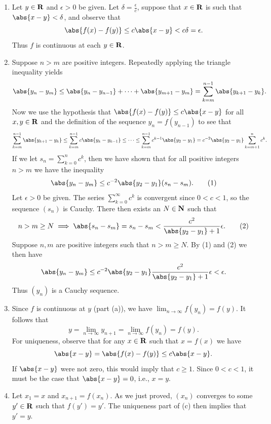 \documentclass{lew98_solutions}
\begin{document}
\begin{solution}
    \begin{enumerate}
        \item Let \( y \in \mathbf{R} \) and \( \epsilon > 0 \) be given. Let \( \delta = \tfrac{\epsilon}{c} \), suppose that \( x \in \mathbf{R} \) is such that \( \abs{x - y} < \delta \), and observe that
        \[
            \abs{f(x) - f(y)} \leq c \abs{x - y} < c \delta = \epsilon.
        \]
        Thus \( f \) is continuous at each \( y \in \mathbf{R} \).

        \item Suppose \( n > m \) are positive integers. Repeatedly applying the triangle inequality yields
        \[
            \abs{y_n - y_m} \leq \abs{y_n - y_{n-1}} + \cdots + \abs{y_{m+1} - y_m} = \sum_{k=m}^{n-1} \abs{y_{k+1} - y_k}.
        \]
        Now we use the hypothesis that \( \abs{f(x) - f(y)} \leq c \abs{x - y} \) for all \( x, y \in \mathbf{R} \) and the definition of the sequence \( y_n = f(y_{n-1}) \) to see that
        \[
            \sum_{k=m}^{n-1} \abs{y_{k+1} - y_k} \leq \sum_{k=m}^{n-1} c \abs{y_k - y_{k-1}} \leq \cdots \leq \sum_{k=m}^{n-1} c^{k-1} \abs{y_2 - y_1} = c^{-2} \abs{y_2 - y_1} \sum_{k=m+1}^n c^k.
        \]
        If we let \( s_n = \sum_{k=0}^n c^k \), then we have shown that for all positive integers \( n > m \) we have the inequality
        \[
            \abs{y_n - y_m} \leq c^{-2} \abs{y_2 - y_1} (s_n - s_m). \tag{1}
        \]
        Let \( \epsilon > 0 \) be given. The series \( \sum_{k=0}^{\infty} c^k \) is convergent since \( 0 < c < 1 \), so the sequence \( (s_n) \) is Cauchy. There then exists an \( N \in \mathbf{N} \) such that
        \[
            n > m \geq N \implies \abs{s_n - s_m} = s_n - s_m < \frac{c^2}{\abs{y_2 - y_1} + 1} \epsilon. \tag{2}
        \]
        Suppose \( n, m \) are positive integers such that \( n > m \geq N \). By (1) and (2) we then have
        \[
            \abs{y_n - y_m} \leq c^{-2} \abs{y_2 - y_1} \frac{c^2}{\abs{y_2 - y_1} + 1} \epsilon < \epsilon.
        \]
        Thus \( (y_n) \) is a Cauchy sequence.

        \item Since \( f \) is continuous at \( y \) (part (a)), we have \( \lim_{n \to \infty} f(y_n) = f(y) \). It follows that
        \[
            y = \lim_{n \to \infty} y_{n+1} = \lim_{n \to \infty} f(y_n) = f(y).
        \]
        For uniqueness, observe that for any \( x \in \mathbf{R} \) such that \( x = f(x) \) we have
        \[
            \abs{x - y} = \abs{f(x) - f(y)} \leq c \abs{x - y}.
        \]
        If \( \abs{x - y} \) were not zero, this would imply that \( c \geq 1 \). Since \( 0 < c < 1 \), it must be the case that \( \abs{x - y} = 0 \), i.e., \( x = y \).

        \item Let \( x_1 = x \) and \( x_{n+1} = f(x_n) \). As we just proved, \( (x_n) \) converges to some \( y' \in \mathbf{R} \) such that \( f(y') = y' \). The uniqueness part of (c) then implies that \( y' = y \).
    \end{enumerate}
\end{solution}
\end{document}
